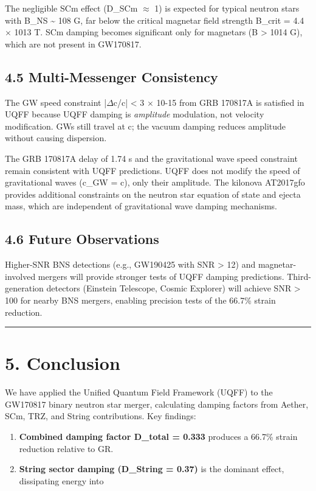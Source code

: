 \documentclass[11pt]{article}
\begin{document}
The negligible SCm effect (D\_SCm $\approx$ 1) is expected for typical neutron stars with B\_NS \textasciitilde{} 108 G, far below the critical magnetar field strength B\_crit = 4.4 $\times$ 1013 T. SCm damping becomes significant only for magnetars (B > 1014 G), which are not present in GW170817.

\subsection*{4.5 Multi-Messenger Consistency}

The GW speed constraint |$\Delta$c/c| < 3 $\times$ 10-15 from GRB 170817A is satisfied in UQFF because UQFF damping is \emph{amplitude} modulation, not velocity modification. GWs still travel at c; the vacuum damping reduces amplitude without causing dispersion.

The GRB 170817A delay of 1.74 s and the gravitational wave speed constraint remain consistent with UQFF predictions. UQFF does not modify the speed of gravitational waves (c\_GW = c), only their amplitude. The kilonova AT2017gfo provides additional constraints on the neutron star equation of state and ejecta mass, which are independent of gravitational wave damping mechanisms.

\subsection*{4.6 Future Observations}

Higher-SNR BNS detections (e.g., GW190425 with SNR > 12) and magnetar-involved mergers will provide stronger tests of UQFF damping predictions. Third-generation detectors (Einstein Telescope, Cosmic Explorer) will achieve SNR > 100 for nearby BNS mergers, enabling precision tests of the 66.7\% strain reduction.

\noindent\rule{\textwidth}{0.4pt}

\section*{5. Conclusion}

We have applied the Unified Quantum Field Framework (UQFF) to the GW170817 binary neutron star merger, calculating damping factors from Aether, SCm, TRZ, and String contributions. Key findings:

\begin{enumerate}
  \item \textbf{Combined damping factor D\_total = 0.333} produces a 66.7\% strain reduction relative to GR.
  \item \textbf{String sector damping (D\_String = 0.37)} is the dominant effect, dissipating energy into
\end{enumerate}
\end{document}

